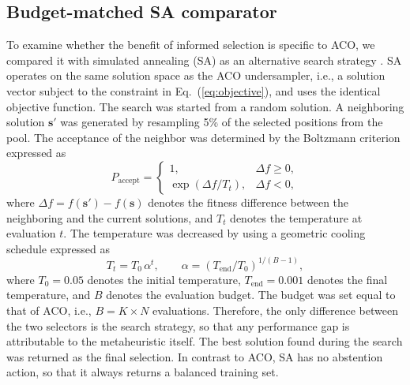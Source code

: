 \documentclass[pdflatex,sn-basic]{sn-jnl}
\begin{document}
\subsection{Budget-matched SA comparator}
\label{sec:sa}
To examine whether the benefit of informed selection is specific to ACO,
we compared it with simulated annealing (SA) as an alternative search
strategy \citep{kirkpatrick1983optimization, chennuru2022simulated}. SA
operates on the same solution space as the ACO undersampler, i.e., a
solution vector subject to the constraint in Eq.~(\ref{eq:objective}),
and uses the identical objective function. The search was started from a
random solution. A neighboring solution $\mathbf{s}'$ was generated by
resampling 5\% of the selected positions from the pool. The acceptance
of the neighbor was determined by the Boltzmann criterion expressed as
\begin{equation}
  P_{\mathrm{accept}} =
  \begin{cases}
    1, & \Delta f \geq 0,\\[2pt]
    \exp\!\left(\Delta f / T_t\right), & \Delta f < 0,
  \end{cases}
  \label{eq:boltzmann}
\end{equation}
where $\Delta f = f(\mathbf{s}') - f(\mathbf{s})$ denotes the fitness
difference between the neighboring and the current solutions, and $T_t$
denotes the temperature at evaluation $t$. The temperature was decreased
by using a geometric cooling schedule expressed as
\begin{equation}
  T_t = T_0\,\alpha^{t},
  \qquad
  \alpha = \left(T_{\mathrm{end}}/T_0\right)^{1/(B-1)},
  \label{eq:cooling}
\end{equation}
where $T_0 = 0.05$ denotes the initial temperature, $T_{\mathrm{end}} =
0.001$ denotes the final temperature, and $B$ denotes the evaluation
budget. The budget was set equal to that of ACO, i.e., $B = K \times N$
evaluations. Therefore, the only
difference between the two selectors is the search strategy, so that any
performance gap is attributable to the metaheuristic itself. The best
solution found during the search was returned as the final selection. In
contrast to ACO, SA has no abstention action, so that it always returns
a balanced training set.
\end{document}
